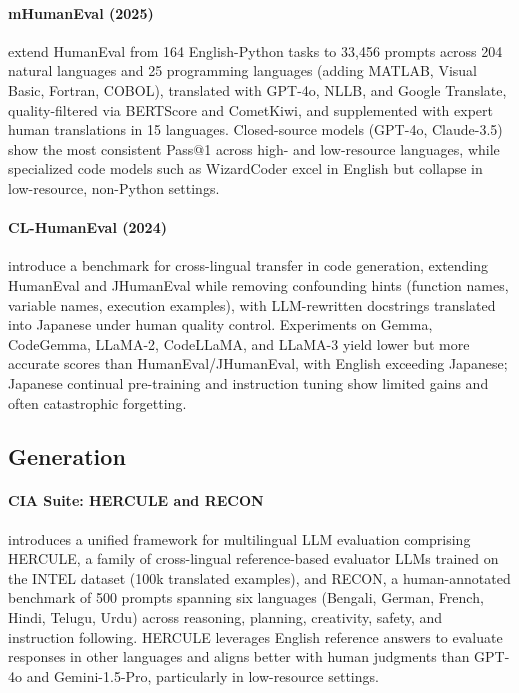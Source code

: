 \documentclass[letterpaper]{article}
\begin{document}
\paragraph{mHumanEval (2025)} \citet{raihan-etal-2025-mhumaneval} extend HumanEval from 164 English-Python tasks to 33,456 prompts across 204 natural languages and 25 programming languages (adding MATLAB, Visual Basic, Fortran, COBOL), translated with GPT-4o, NLLB, and Google Translate, quality-filtered via BERTScore and CometKiwi, and supplemented with expert human translations in 15 languages. Closed-source models (GPT-4o, Claude-3.5) show the most consistent Pass@1 across high- and low-resource languages, while specialized code models such as WizardCoder excel in English but collapse in low-resource, non-Python settings.

\paragraph{CL-HumanEval (2024)} \citet{sato-etal-2024-cl} introduce a benchmark for cross-lingual transfer in code generation, extending HumanEval and JHumanEval while removing confounding hints (function names, variable names, execution examples), with LLM-rewritten docstrings translated into Japanese under human quality control. Experiments on Gemma, CodeGemma, LLaMA-2, CodeLLaMA, and LLaMA-3 yield lower but more accurate scores than HumanEval/JHumanEval, with English exceeding Japanese; Japanese continual pre-training and instruction tuning show limited gains and often catastrophic forgetting.

\subsection{Generation}

\paragraph{CIA Suite: HERCULE and RECON} \citet{doddapaneni2025crosslingualautoevaluationassessing}
introduces a unified framework for multilingual LLM evaluation comprising HERCULE, a family of cross-lingual reference-based evaluator LLMs trained on the INTEL dataset (100k translated examples), and RECON, a human-annotated benchmark of 500 prompts spanning six languages (Bengali, German, French, Hindi, Telugu, Urdu) across reasoning, planning, creativity, safety, and instruction following. HERCULE leverages English reference answers to evaluate responses in other languages and aligns better with human judgments than GPT-4o and Gemini-1.5-Pro, particularly in low-resource settings.
\end{document}
